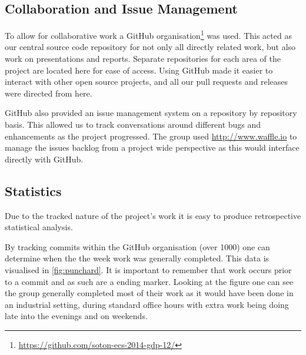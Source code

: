 \subsection{Collaboration and Issue Management}
To allow for collaborative work a GitHub organisation\footnote{\url{https://github.com/soton-ecs-2014-gdp-12/}} was used. This acted as our central source code repository for not only all directly related work, but also work on presentations and reports. Separate repositories for each area of the project are located here for ease of access. Using GitHub made it easier to interact with other open source projects, and all our pull requests and releases were directed from here. 

GitHub also provided an issue management system on a repository by repository basis. This allowed us to track conversations around different bugs and enhancements as the project progressed.
The group used \url{http://www.waffle.io} to manage the issues backlog from a project wide perspective as this would interface directly with GitHub.

\subsection{Statistics}

Due to the tracked nature of the project's work it is easy to produce retrospective statistical analysis.

By tracking commits within the GitHub organisation (over 1000) one can determine when the the week work was generally completed. This data is visualised in \autoref{fig:punchard}. It is important to remember that work occurs prior to a commit and as such are a ending marker. Looking at the figure one can see the group generally completed most of their work as it would have been done in an industrial setting, during standard office hours with extra work being doing late into the evenings and on weekends.

